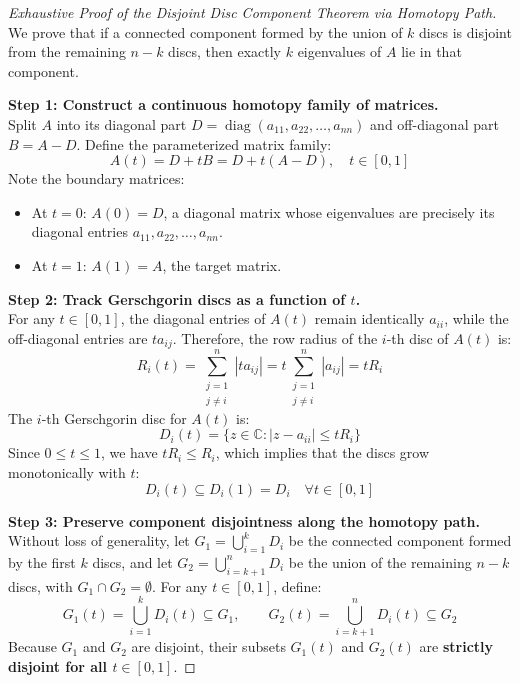 \begin{proof}[Exhaustive Proof of the Disjoint Disc Component Theorem via Homotopy Path]
We prove that if a connected component formed by the union of $k$ discs is disjoint from the remaining $n - k$ discs, then exactly $k$ eigenvalues of $A$ lie in that component.

\medskip
\noindent\textbf{Step 1: Construct a continuous homotopy family of matrices.} \\
Split $A$ into its diagonal part $D = \operatorname{diag}(a_{11}, a_{22}, \dots, a_{nn})$ and off-diagonal part $B = A - D$. Define the parameterized matrix family:
\begin{equation}
    A(t) = D + t B = D + t(A - D), \quad t \in [0, 1]
\end{equation}
Note the boundary matrices:
\begin{itemize}[noitemsep]
    \item At $t = 0$: $A(0) = D$, a diagonal matrix whose eigenvalues are precisely its diagonal entries $a_{11}, a_{22}, \dots, a_{nn}$.
    \item At $t = 1$: $A(1) = A$, the target matrix.
\end{itemize}

\noindent\textbf{Step 2: Track Gerschgorin discs as a function of $t$.} \\
For any $t \in [0, 1]$, the diagonal entries of $A(t)$ remain identically $a_{ii}$, while the off-diagonal entries are $t a_{ij}$. Therefore, the row radius of the $i$-th disc of $A(t)$ is:
\begin{equation}
    R_i(t) = \sum_{\substack{j=1 \\ j \ne i}}^n |t a_{ij}| = t \sum_{\substack{j=1 \\ j \ne i}}^n |a_{ij}| = t R_i
\end{equation}
The $i$-th Gerschgorin disc for $A(t)$ is:
\begin{equation}
    D_i(t) = \big\{ z \in \mathbb{C} : |z - a_{ii}| \le t R_i \big\}
\end{equation}
Since $0 \le t \le 1$, we have $t R_i \le R_i$, which implies that the discs grow monotonically with $t$:
\begin{equation}
    D_i(t) \subseteq D_i(1) = D_i \quad \forall t \in [0, 1]
\end{equation}

\noindent\textbf{Step 3: Preserve component disjointness along the homotopy path.} \\
Without loss of generality, let $G_1 = \bigcup_{i=1}^k D_i$ be the connected component formed by the first $k$ discs, and let $G_2 = \bigcup_{i=k+1}^n D_i$ be the union of the remaining $n - k$ discs, with $G_1 \cap G_2 = \emptyset$.
For any $t \in [0, 1]$, define:
\begin{equation}
    G_1(t) = \bigcup_{i=1}^k D_i(t) \subseteq G_1, \qquad G_2(t) = \bigcup_{i=k+1}^n D_i(t) \subseteq G_2
\end{equation}
Because $G_1$ and $G_2$ are disjoint, their subsets $G_1(t)$ and $G_2(t)$ are \textbf{strictly disjoint for all $t \in [0, 1]$}.


\end{proof}
